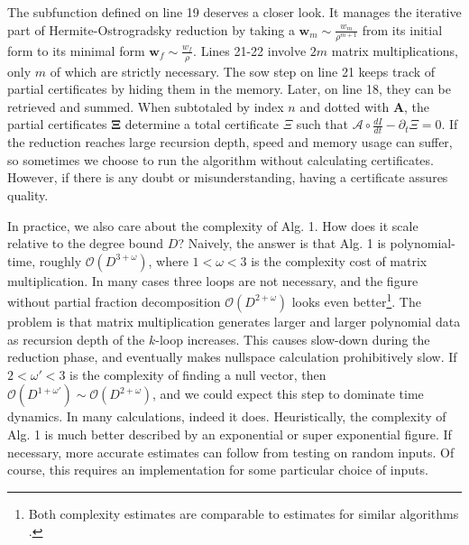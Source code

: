 \documentclass[nofootinbib,preprint]{revtex4-1}
\begin{document}
The subfunction defined on line 19 deserves a closer look. It manages the iterative part 
of Hermite-Ostrogradsky reduction by taking a $\mathbf{w}_m\sim \frac{w_m}{\rho^{m+1}}$ from
its initial form to its minimal form  $\mathbf{w}_f\sim \frac{w_f}{\rho}$. Lines 21-22 involve
$2m$ matrix multiplications, only $m$ of which are strictly necessary. The sow step on line 
21 keeps track of partial certificates by hiding them in the memory. Later, on line 18,
they can be retrieved and summed. When subtotaled by index $n$ and dotted with 
$\mathbf{A}$, the partial certificates $\mathbf{\Xi}$ determine a total certificate 
$\Xi$ such that ${\mathcal{A} \circ \frac{dI}{dt}-\partial_t \Xi=0} $. If the reduction 
reaches large recursion depth, speed and memory usage can suffer, so sometimes we choose to
run the algorithm without calculating certificates. However, if there is any doubt or misunderstanding, 
having a certificate assures quality. 
 
In practice, we also care about the complexity of Alg. 1. How does it scale relative to the 
degree bound $D$? Naively, the answer is that Alg. 1 is polynomial-time, roughly
$\mathcal{O}(D^{3+\omega})$, where $1<\omega<3$ is the complexity cost of matrix multiplication. 
In many cases three loops are not necessary, and the figure without partial fraction
decomposition  $\mathcal{O}(D^{2+\omega})$ looks even better\footnote{Both complexity 
estimates are comparable to estimates for similar algorithms \cite{COMPLEXITY2010}.}. The problem is that 
matrix multiplication generates larger and larger polynomial data as recursion depth of 
the $k$-loop increases. This causes slow-down during the reduction phase, 
and eventually makes nullspace calculation prohibitively slow. If $2<\omega'<3$ is the complexity 
of finding a null vector, then $\mathcal{O}(D^{1+\omega'})\sim \mathcal{O}(D^{2+\omega})$, 
and we could expect this step to dominate time dynamics. In many calculations, indeed it does. 
Heuristically, the complexity of Alg. 1 is much better described by an exponential or 
super exponential figure. If necessary, more accurate estimates can follow from
testing on random inputs. Of course, this requires an implementation for some particular
choice of inputs. 
\end{document}
